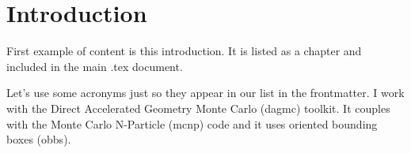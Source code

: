 \chapter{Introduction}

First example of content is this introduction.
It is listed as a chapter and included in the main .tex document.

Let's use some acronyms just so they appear in our list in the 
frontmatter. I work with the Direct Accelerated Geometry Monte Carlo
(\ac{dagmc}) toolkit. It couples with the Monte Carlo N-Particle (\ac{mcnp}) code and it uses oriented bounding boxes (\ac{obb}s).
